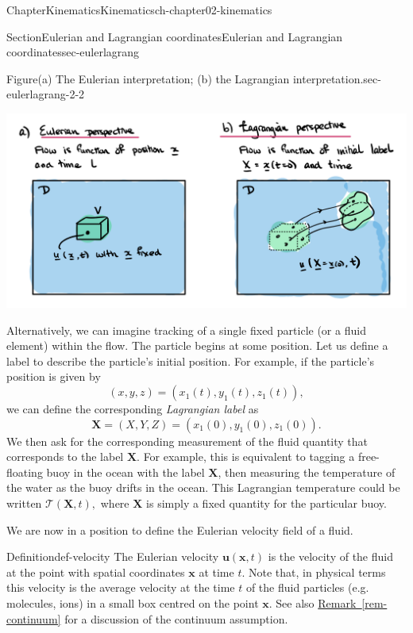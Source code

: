\documentclass[oneside,10pt,]{book}
\newcommand{\xreffont}{\relax}
\numberwithin{equation}{section}
\newcommand{\bx}{\boldsymbol{x}}
\newcommand{\bX}{\boldsymbol{X}}
\newcommand{\bu}{\boldsymbol{u}}
\begin{document}
\begin{chapterptx}{Chapter}{Kinematics}{}{Kinematics}{}{}{ch-chapter02-kinematics}
\begin{sectionptx}{Section}{Eulerian and Lagrangian coordinates}{}{Eulerian and Lagrangian coordinates}{}{}{sec-eulerlagrang}
\begin{introduction}{}
\begin{figureptx}{Figure}{(a) The Eulerian interpretation; (b) the Lagrangian interpretation.}{sec-eulerlagrang-2-2}{}%
\begin{image}{0}{1}{0}{}%
\includegraphics[width=\linewidth]{external/ch-chapter01-kinematics-euler-vs-lagrange.png}
\end{image}%
\tcblower
\end{figureptx}%
Alternatively, we can imagine tracking of a single fixed particle (or a fluid element) within the flow. The particle begins at some position. Let us define a label to describe the particle's initial position. For example, if the particle's position is given by%
\begin{equation*}
(x, y, z) = (x_1(t), y_1(t), z_1(t)),
\end{equation*}
we can define the corresponding \emph{Lagrangian label} as%
\begin{equation*}
\bX = (X, Y, Z) = (x_1(0), y_1(0), z_1(0)).
\end{equation*}
We then ask for the corresponding measurement of the fluid quantity that corresponds to the label \(\bX\). For example, this is equivalent to tagging a free-floating buoy in the ocean with the label \(\bX\), then measuring the temperature of the water as the buoy drifts in the ocean. This Lagrangian temperature could be written \(\mathcal{T}(\bX, t),\) where \(\bX\) is simply a fixed quantity for the particular buoy.%
\par
We are now in a position to define the Eulerian velocity field of a fluid.%
\begin{definition}{Definition}{}{def-velocity}%
The Eulerian velocity \(\bu(\bx,t)\) is the velocity of the fluid at the point with spatial coordinates \(\bx\) at time \(t\). Note that, in physical terms this velocity is the average velocity at the time \(t\) of the fluid particles (e.g. molecules, ions) in a small box centred on the point \(\bx\). See also \hyperref[rem-continuum]{Remark~{\xreffont\ref{rem-continuum}}} for a discussion of the continuum assumption.%

\end{definition}
\end{introduction}
\end{sectionptx}
\end{chapterptx}
\end{document}

